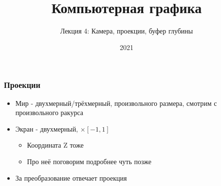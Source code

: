 \documentclass{beamer}
\title{Компьютерная графика}
\subtitle{Лекция 4: Камера, проекции, буфер глубины}
\date{2021}
\begin{document}
\frame{\titlepage}

\begin{frame}[fragile]
\frametitle{Проекции}
\begin{itemize}
\item Мир - двухмерный/трёхмерный, произвольного размера, смотрим с произвольного ракурса
\pause
\item Экран - двухмерный, \begin{math}[-1, 1] \times [-1, 1]\end{math}
\pause
\begin{itemize}
\item Координата Z тоже \begin{math}[-1, 1]\end{math}
\item Про неё поговорим подробнее чуть позже
\end{itemize}
\pause
\item За преобразование отвечает проекция
\end{itemize}
\end{frame}
\end{document}
